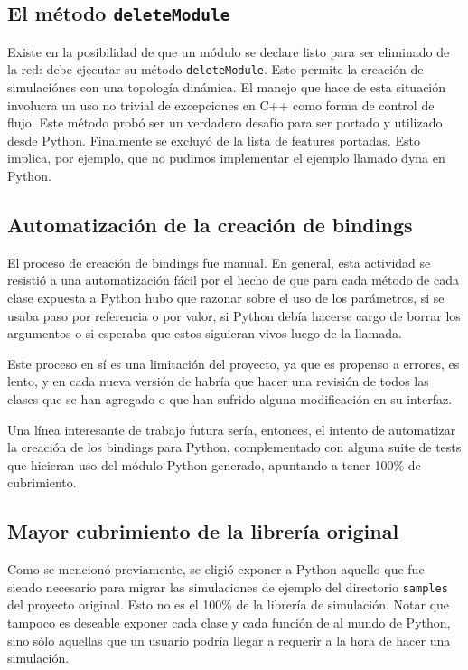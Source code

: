\subsection{El método \texttt{deleteModule}}

Existe en \omnetpp{} la posibilidad de que un módulo se declare listo para ser
eliminado de la red: debe ejecutar su método \verb!deleteModule!. Esto permite la
creación de simulaciónes con una topología dinámica. El manejo que hace \omnetpp{}
de esta situación involucra un uso no trivial de excepciones en C++ como forma
de control de flujo. Este método probó ser un verdadero desafío para ser
portado y utilizado desde Python. Finalmente se excluyó de la lista de features
portadas. Esto implica, por ejemplo, que no pudimos implementar el ejemplo
llamado dyna en Python.

\subsection{Automatización de la creación de bindings}

El proceso de creación de bindings fue manual. En general, esta actividad se
resistió a una automatización fácil por el hecho de que para cada método de
cada clase expuesta a Python hubo que razonar sobre el uso de los parámetros,
si se usaba paso por referencia o por valor, si Python debía hacerse cargo de
borrar los argumentos o si \omnetpp{} esperaba que estos siguieran vivos luego de
la llamada.

Este proceso en sí es una limitación del proyecto, ya que es propenso a
errores, es lento, y en cada nueva versión de \omnetpp{} habría que hacer una
revisión de todos las clases que se han agregado o que han sufrido alguna
modificación en su interfaz.

Una línea interesante de trabajo futura sería, entonces, el intento de
automatizar la creación de los bindings para Python, complementado con alguna
suite de tests que hicieran uso del módulo Python generado, apuntando a tener
100\% de cubrimiento.

\subsection{Mayor cubrimiento de la librería original}

Como se mencionó previamente, se eligió exponer a Python aquello que fue siendo
necesario para migrar las simulaciones de ejemplo del directorio \verb!samples! del
proyecto original. Esto no es el 100\% de la librería de simulación. Notar que
tampoco es deseable exponer cada clase y cada función de \omnetpp{} al mundo de
Python, sino sólo aquellas que un usuario podría llegar a requerir a la hora de
hacer una simulación.

